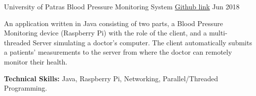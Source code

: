 \begin{cventries}
  \cventry
    {University of Patras} %
    {Blood Pressure Monitoring System} %
    {\href{https://github.com/Panagiotis-Zachos/Blood-Pressure-Monitoring-System}{Github link}} %
    {Jun 2018} %
    {
      \begin{cvitems} %
        \item {An application written in Java consisting of two parts, a Blood Pressure Monitoring device (Raspberry Pi) with the role of the client, and a multi-threaded Server simulating a doctor's computer. The client automatically submits a patients' measurements to the server from where the doctor can remotely monitor their health.}
        \item {\textbf{Technical Skills:} Java, Raspberry Pi, Networking, Parallel/Threaded Programming.}
      \end{cvitems}
    }




\end{cventries}
